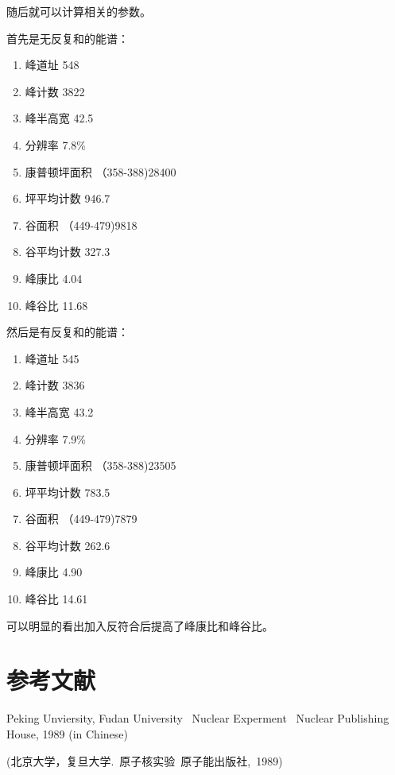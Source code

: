 \documentclass[a4paper,10.0pt,twoside]{npr}
\begin{document}
\begin{multicols}{2}
随后就可以计算相关的参数。

首先是无反复和的能谱：

\begin{enumerate}
	\item 峰道址 548
	\item 峰计数 3822
	\item 峰半高宽 42.5
	\item 分辨率 7.8\%
	\item 康普顿坪面积 （358-388)28400
	\item 坪平均计数 946.7
	\item 谷面积 （449-479)9818
	\item 谷平均计数 327.3
	\item 峰康比 4.04
	\item 峰谷比 11.68
\end{enumerate}

然后是有反复和的能谱：

\begin{enumerate}
	\item 峰道址 545
	\item 峰计数 3836
	\item 峰半高宽 43.2
	\item 分辨率 7.9\%
	\item 康普顿坪面积 （358-388)23505
	\item 坪平均计数 783.5
	\item 谷面积 （449-479)7879
	\item 谷平均计数 262.6
	\item 峰康比 4.90
	\item 峰谷比 14.61
\end{enumerate}

可以明显的看出加入反符合后提高了峰康比和峰谷比。

\section{参考文献}

\noindent
[1] Peking Unviersity, Fudan University \ Nuclear Experment
\ Nuclear Publishing House, 1989 (in Chinese)

\noindent
 (北京大学，复旦大学.\ 原子核实验\ 原子能出版社,\ 1989)

\end{multicols}

\newpage

\clearpage
\end{document}
